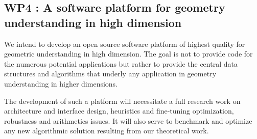 
\subsection*{WP4 : A software platform for geometry understanding in high
  dimension}

We intend to develop an open source software platform of highest
quality %
for geometric understanding in high dimension.  The goal
is not to provide code for the numerous potential applications but
rather to provide the central data structures and algorithms that
underly any application in geometry understanding in higher
dimensions.

The development of such a
platform will necessitate a full research work on architecture and
interface design, heuristics and fine-tuning optimization, robustness
and arithmetics issues. It will also serve to benchmark and optimize any
new algorithmic solution resulting from our theoretical work. 
%
%
%
